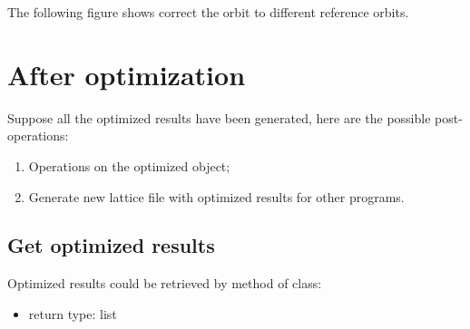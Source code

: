 \documentclass[letterpaper,10pt,english]{sphinxmanual}
\let\sphinxpxdimen\pdfpxdimen\else\newdimen\sphinxpxdimen
\begin{document}
The following figure shows correct the orbit to different reference orbits.

\noindent{\hspace*{\fill}\sphinxincludegraphics[width=500\sphinxpxdimen]{{oc_015}.png}\hspace*{\fill}}


\section{After optimization}
\label{\detokenize{src/demos/demo6::doc}}\label{\detokenize{src/demos/demo6:after-optimization}}
Suppose all the optimized results have been generated, here are the
possible post-operations:
\begin{enumerate}
\item {} 
Operations on the optimized  object;

\item {} 
Generate new lattice file with optimized results for other programs.

\end{enumerate}


\begin{sphinxVerbatim}[commandchars=\\\{\},formatcom=\scriptsize]
  
  
\end{sphinxVerbatim}


\subsection{Get optimized results}
\label{\detokenize{src/demos/demo6:get-optimized-results}}
Optimized results could be retrieved by  method of
 class:
\begin{itemize}
\item {} 
return type: list

\end{itemize}
\end{document}
